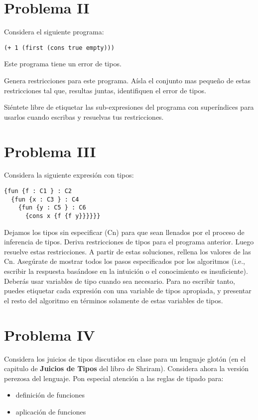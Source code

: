 \documentclass{article}
\begin{document}
\section*{Problema II}
Considera el siguiente programa:

\begin{verbatim}
(+ 1 (first (cons true empty)))
\end{verbatim}

Este programa tiene un error de tipos.

Genera restricciones para este programa. Aísla el conjunto mas pequeño de
estas restricciones tal que, resultas juntas, identifiquen el error de tipos.

Siéntete libre de etiquetar las sub-expresiones del programa con superíndices
para usarlos cuando escribas y resuelvas tus restricciones.

\section*{Problema III}
Considera la siguiente expresión con tipos:

\begin{verbatim}
{fun {f : C1 } : C2
  {fun {x : C3 } : C4
    {fun {y : C5 } : C6
      {cons x {f {f y}}}}}}
\end{verbatim}

Dejamos los tipos sin especificar (Cn) para que sean llenados por el proceso
de inferencia de tipos. Deriva restricciones de tipos para el programa anterior.
Luego resuelve estas restricciones. A partir de estas soluciones, rellena los
valores de las Cn. Asegúrate de mostrar todos los pasos especificados por los
algoritmos (i.e., escribir la respuesta basándose en la intuición o el conocimiento
es insuficiente). Deberás usar variables de tipo cuando sea necesario.
Para no escribir tanto, puedes etiquetar cada expresión con una variable de tipos
apropiada, y presentar el resto del algoritmo en términos solamente de estas
variables de tipos.

\section*{Problema IV}
Considera los juicios de tipos discutidos en clase para un lenguaje glotón
(en el capitulo de \textbf{Juicios de Tipos} del libro de Shriram).
Considera ahora la versión perezosa del lenguaje. Pon especial atención a
las reglas de tipado para:

\begin{itemize}
\item definición de funciones
\item aplicación de funciones
\end{itemize}
\end{document}
